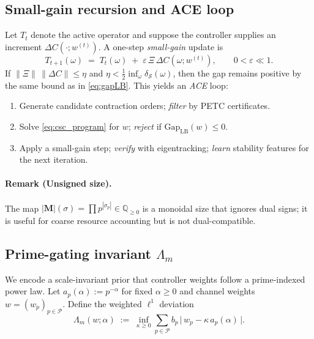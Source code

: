 \documentclass[11pt]{article}
\theoremstyle{plain}
\theoremstyle{definition}
\newcommand{\Q}{\mathbb{Q}}
\newcommand{\M}{\mathbf{M}} %
\begin{document}
\subsection{Small-gain recursion and ACE loop}\label{subsec:smallgain}
Let $T_{t}$ denote the active operator and suppose the controller supplies an increment $\Delta C(\cdot; w^{(t)})$. A one-step \emph{small-gain} update is
\[
  T_{t+1}(\omega)\;=\;T_t(\omega)\; +\; \varepsilon\, \Xi\, \Delta C(\omega;w^{(t)}),\qquad 0<\varepsilon\ll 1.
\]
If $\|\Xi\|\,\|\Delta C\|\le \eta$ and $\eta<\tfrac12\inf_\omega \delta_{\mathcal S}(\omega)$, then the gap remains positive by the same bound as in \eqref{eq:gapLB}. This yields an \emph{ACE} loop:
\begin{enumerate}[leftmargin=*]
  \item Generate candidate contraction orders; \emph{filter} by PETC certificates.
  \item Solve \eqref{eq:csc_program} for $w$; \emph{reject} if $\mathrm{Gap}_{\mathrm{LB}}(w)\le 0$.
  \item Apply a small-gain step; \emph{verify} with eigentracking; \emph{learn} stability features for the next iteration.
\end{enumerate}

\paragraph{Remark (Unsigned size).} The map $|\M|(\sigma)=\prod p^{|\sigma_p|}\in\Q_{\ge0}$ is a monoidal size that ignores dual signs; it is useful for coarse resource accounting but is not dual-compatible.
\subsection{Prime-gating invariant $\Lambda_m$}
We encode a scale-invariant prior that controller weights follow a prime-indexed power law.
Let $a_p(\alpha):=p^{-\alpha}$ for fixed $\alpha\ge 0$ and channel weights $w=(w_p)_{p\in\mathcal P}$.
Define the weighted $\ell^1$ deviation
\begin{equation}\label{eq:Lambda_m}
  \Lambda_m(w;\alpha) \;:=\; \inf_{\kappa\ge 0} \sum_{p\in\mathcal P} b_p\,\bigl|\, w_p - \kappa\, a_p(\alpha) \,\bigr|.
\end{equation}
\end{document}
